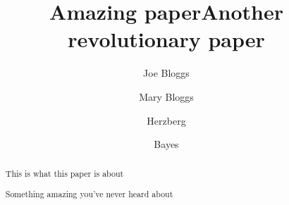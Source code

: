 
\author[1]{Joe Bloggs}
\author[2]{Mary Bloggs}
\title{Amazing paper}

\begin{abstract}
    This is what this paper is about
\end{abstract}

\author[1]{Herzberg}
\author[2]{Bayes}
\title{Another revolutionary paper}

\begin{abstract}
    Something amazing you've never heard about
\end{abstract}